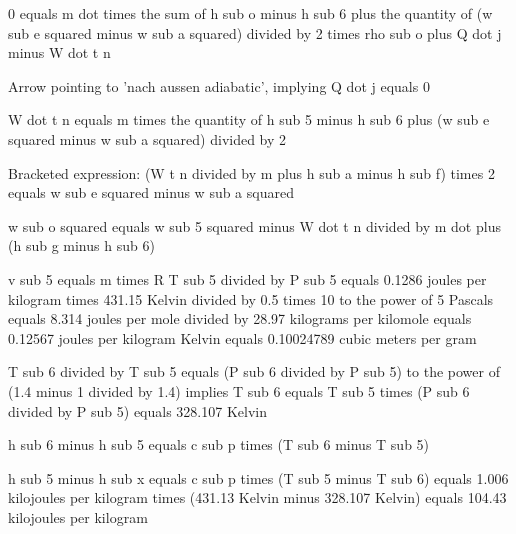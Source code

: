 0 equals m dot times the sum of h sub o minus h sub 6 plus the quantity of (w sub e squared minus w sub a squared) divided by 2 times rho sub o plus Q dot j minus W dot t n  

Arrow pointing to 'nach aussen adiabatic', implying Q dot j equals 0  

W dot t n equals m times the quantity of h sub 5 minus h sub 6 plus (w sub e squared minus w sub a squared) divided by 2  

Bracketed expression: (W t n divided by m plus h sub a minus h sub f) times 2 equals w sub e squared minus w sub a squared  

w sub o squared equals w sub 5 squared minus W dot t n divided by m dot plus (h sub g minus h sub 6)  

v sub 5 equals m times R T sub 5 divided by P sub 5 equals 0.1286 joules per kilogram times 431.15 Kelvin divided by 0.5 times 10 to the power of 5 Pascals equals 8.314 joules per mole divided by 28.97 kilograms per kilomole equals 0.12567 joules per kilogram Kelvin equals 0.10024789 cubic meters per gram  

T sub 6 divided by T sub 5 equals (P sub 6 divided by P sub 5) to the power of (1.4 minus 1 divided by 1.4) implies T sub 6 equals T sub 5 times (P sub 6 divided by P sub 5) equals 328.107 Kelvin  

h sub 6 minus h sub 5 equals c sub p times (T sub 6 minus T sub 5)  

h sub 5 minus h sub x equals c sub p times (T sub 5 minus T sub 6) equals 1.006 kilojoules per kilogram times (431.13 Kelvin minus 328.107 Kelvin) equals 104.43 kilojoules per kilogram